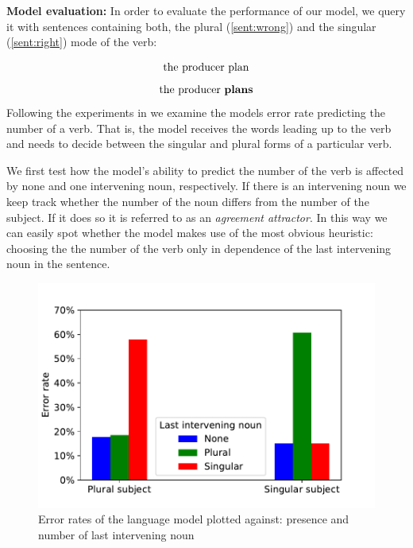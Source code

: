 \documentclass[11pt,a4paper]{article}
\begin{document}
\textbf{Model evaluation:} In order to evaluate the performance of our model, we query it with sentences containing both, the plural (\ref{sent:wrong}) and the singular (\ref{sent:right}) mode of the verb: 

\begin{equation}
	\label{sent:wrong}
	\textnormal{the producer plan}
\end{equation}
\begin{equation}
	\label{sent:right}
	\textnormal{the producer  \textbf{plans}}
\end{equation}
Following the experiments in \citep{Linzen2016} we examine the models error rate predicting the number of a verb. That is, the model receives the words leading up to the verb and needs to decide between the singular and plural forms of a particular verb.

We first test how the model's ability to predict the number of the verb is affected by none and one intervening noun, respectively. If there is an intervening noun we keep track whether the number of the noun differs from the number of the subject. If it does so it is referred to as an \textit{agreement attractor}. In this way we can easily spot whether the model makes use of the most obvious heuristic: choosing the the number of the verb only in dependence of the last intervening noun in the sentence.

    \begin{figure}
    \centering
        \includegraphics[scale=0.5]{2b.pdf}
            	\caption{Error rates of the language model plotted against: presence and number of last intervening noun}
        \label{fig:2b}
    \end{figure}
\end{document}
